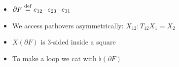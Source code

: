 \documentclass[14pt,aspectratio=169]{beamer}
\begin{document}
\begin{frame}
\begin{columns}
\begin{column}{0.6\textwidth}
\vspace{12pt}
\begingroup
{}

\endgroup
\end{column}
\begin{column}{0.4\textwidth}
\begin{itemize}
\item \( \partial F\stackrel{\mathrm{def}}{=} e_{12}\cdot e_{23}\cdot e_{31}  \)
\item We access pathovers asymmetrically: \( X_{12}:T_{12}X_1=X_2 \)
\item \( X(\partial F) \) is 3-sided inside a square
\item To make a loop we cat with \( \flat(\partial F) \)
\end{itemize}
\end{column}
\end{columns}
\end{frame}
\end{document}
